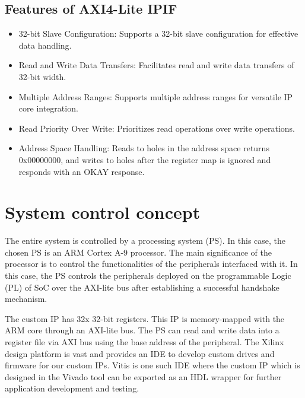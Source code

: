 \subsection{Features of AXI4-Lite IPIF} 
\begin{itemize}
    \item 	32-bit Slave Configuration: Supports a 32-bit slave configuration for effective data handling.
    \item 	Read and Write Data Transfers: Facilitates read and write data transfers of 32-bit width.
    \item   Multiple Address Ranges: Supports multiple address ranges for versatile IP core integration.
    \item 	Read Priority Over Write: Prioritizes read operations over write operations.
    \item 	Address Space Handling: Reads to holes in the address space returns 0x00000000, and writes to holes after the register map is ignored and responds with an OKAY response.
\end{itemize}




\section{System control concept}

The entire system is controlled by a processing system (PS). In this case, the chosen PS is an ARM Cortex A-9 processor. The main significance of the processor is to control the functionalities of the peripherals interfaced with it. In this case, the PS controls the peripherals deployed on the programmable Logic (PL) of SoC over the AXI-lite bus after establishing a successful handshake mechanism. 
\vspace{2mm}

The custom IP has 32x 32-bit registers. This IP is memory-mapped with the ARM core through an AXI-lite bus. The PS can read and write data into a register file via AXI bus using the base address of the peripheral. The Xilinx design platform is vast and provides an IDE to develop custom drives and firmware for our custom IPs. Vitis is one such IDE where the custom IP which is designed in the Vivado tool can be exported as an HDL wrapper for further application development and testing.





\newpage

